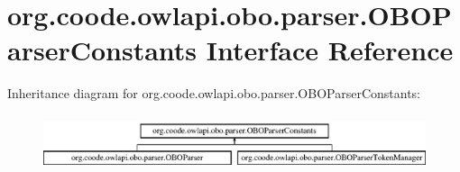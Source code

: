 \hypertarget{interfaceorg_1_1coode_1_1owlapi_1_1obo_1_1parser_1_1_o_b_o_parser_constants}{\section{org.\-coode.\-owlapi.\-obo.\-parser.\-O\-B\-O\-Parser\-Constants Interface Reference}
\label{interfaceorg_1_1coode_1_1owlapi_1_1obo_1_1parser_1_1_o_b_o_parser_constants}
}
Inheritance diagram for org.\-coode.\-owlapi.\-obo.\-parser.\-O\-B\-O\-Parser\-Constants\-:\begin{figure}[H]
\begin{center}
\leavevmode
\includegraphics[height=1.651917cm]{interfaceorg_1_1coode_1_1owlapi_1_1obo_1_1parser_1_1_o_b_o_parser_constants}
\end{center}
\end{figure}
